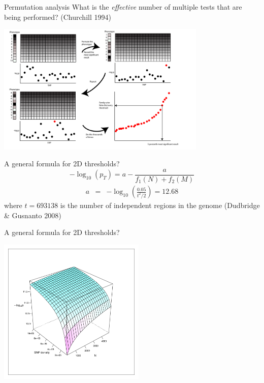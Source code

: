 \documentclass{beamer}
\begin{document}
\begin{frame}{Permutation analysis}
What is the \emph{effective} number of multiple tests that are being performed? (Churchill 1994)
\begin{center}
\includegraphics[width=10cm]{permutationanalysis.pdf}
\end{center}
\end{frame}


\begin{frame}{A general formula for 2D thresholds?}
\begin{equation}
-\log_{10}(p_{T}) = a - \frac{a}{f_{1}(N)+ f_{2}(M)} \nonumber
\label{eqn:general_threshold}
\end{equation}
\begin{eqnarray}
a & = & -\log_{10} \left (\frac{0.05}{t^2/2} \right) = 12.68 \nonumber
\end{eqnarray}
where $t = 693138$ is the number of independent regions in the genome (Dudbridge \& Gusnanto 2008)
\end{frame}

\begin{frame}{A general formula for 2D thresholds?}
\begin{center}
\includegraphics[height=7cm]{threshold_function.pdf}
\end{center}
\end{frame}
\end{document}
